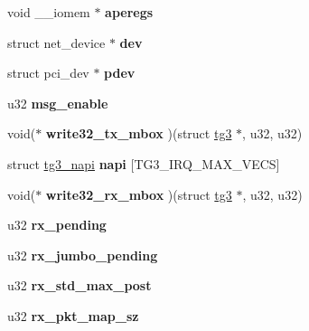 \begin{DoxyCompactItemize}
\item 
\hypertarget{structtg3_aa618ce5e9a1f4f45776cd69f7d5106f1}{
void \_\-\_\-iomem $\ast$ {\bfseries aperegs}}
\label{structtg3_aa618ce5e9a1f4f45776cd69f7d5106f1}

\item 
\hypertarget{structtg3_a9951da42866161c54f0d74bbcb945f86}{
struct net\_\-device $\ast$ {\bfseries dev}}
\label{structtg3_a9951da42866161c54f0d74bbcb945f86}

\item 
\hypertarget{structtg3_a97aeb636be1195cc84f1ae6c6c63c645}{
struct pci\_\-dev $\ast$ {\bfseries pdev}}
\label{structtg3_a97aeb636be1195cc84f1ae6c6c63c645}

\item 
\hypertarget{structtg3_a70bd77aced3a5bcce3d81f62141c7e9f}{
u32 {\bfseries msg\_\-enable}}
\label{structtg3_a70bd77aced3a5bcce3d81f62141c7e9f}

\item 
\hypertarget{structtg3_ae710ae3068abaa51401f172eea6ebed4}{
void($\ast$ {\bfseries write32\_\-tx\_\-mbox} )(struct \hyperlink{structtg3}{tg3} $\ast$, u32, u32)}
\label{structtg3_ae710ae3068abaa51401f172eea6ebed4}

\item 
\hypertarget{structtg3_a693288d462bfa478dfc258195188b773}{
struct \hyperlink{structtg3__napi}{tg3\_\-napi} {\bfseries napi} \mbox{[}TG3\_\-IRQ\_\-MAX\_\-VECS\mbox{]}}
\label{structtg3_a693288d462bfa478dfc258195188b773}

\item 
\hypertarget{structtg3_a2a6ee9d8a73350d560cdd5aefcde404c}{
void($\ast$ {\bfseries write32\_\-rx\_\-mbox} )(struct \hyperlink{structtg3}{tg3} $\ast$, u32, u32)}
\label{structtg3_a2a6ee9d8a73350d560cdd5aefcde404c}

\item 
\hypertarget{structtg3_a70e7bfbb25cb9552b62a2d43959b3c6c}{
u32 {\bfseries rx\_\-pending}}
\label{structtg3_a70e7bfbb25cb9552b62a2d43959b3c6c}

\item 
\hypertarget{structtg3_a86329c65ef1f5601ef43dfce4b3fd2a6}{
u32 {\bfseries rx\_\-jumbo\_\-pending}}
\label{structtg3_a86329c65ef1f5601ef43dfce4b3fd2a6}

\item 
\hypertarget{structtg3_a3584a26964f65e3b5aefcfa22e11feb7}{
u32 {\bfseries rx\_\-std\_\-max\_\-post}}
\label{structtg3_a3584a26964f65e3b5aefcfa22e11feb7}

\item 
\hypertarget{structtg3_a0acbecbfdb1de514bd147681cd57b348}{
u32 {\bfseries rx\_\-pkt\_\-map\_\-sz}}
\label{structtg3_a0acbecbfdb1de514bd147681cd57b348}


\end{DoxyCompactItemize}
